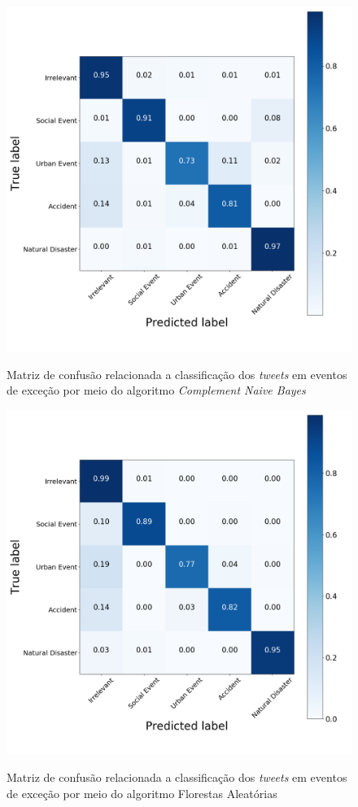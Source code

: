 \documentclass[
	12pt,				%
	oneside,			%
	a4paper,			%
	english,			%
	brazil				%
	]{abntex2ppgsi}
\begin{document}
{{\begin{apendicesenv}
\begin{figure}[!htb]
	\centering
 	  \caption{Matriz de confusão relacionada a classificação dos \textit{tweets} em eventos de exceção por meio do algoritmo \textit{Complement Naive Bayes}}
		\includegraphics[width=1\linewidth]{images/confusion_matrix_cnb.png}
	\label{fig:confusion_matrix_gnb}
\end{figure}

\begin{figure}[!htb]
	\centering
 	  \caption{Matriz de confusão relacionada a classificação dos \textit{tweets} em eventos de exceção por meio do algoritmo Florestas Aleatórias}
		\includegraphics[width=1\linewidth]{images/confusion_matrix_rf.png}
	\label{fig:confusion_matrix_rf}
\end{figure}


\end{apendicesenv}}}
\end{document}

